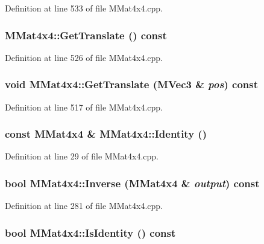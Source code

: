 Definition at line 533 of file MMat4x4.cpp.\hypertarget{class_m_mat4x4_f4ccc5d98e02464db6bb4660851305ad}{
\subsubsection[{GetTranslate}]{ MMat4x4::GetTranslate () const}}
\label{class_m_mat4x4_f4ccc5d98e02464db6bb4660851305ad}




Definition at line 526 of file MMat4x4.cpp.\hypertarget{class_m_mat4x4_cb765b649243077af476897147c75919}{
\subsubsection[{GetTranslate}]{\setlength{\rightskip}{0pt plus 5cm}void MMat4x4::GetTranslate ({\bf MVec3} \& {\em pos}) const}}
\label{class_m_mat4x4_cb765b649243077af476897147c75919}




Definition at line 517 of file MMat4x4.cpp.\hypertarget{class_m_mat4x4_ea61fe6cd5a7fdea9260a96812a95298}{
\subsubsection[{Identity}]{\setlength{\rightskip}{0pt plus 5cm}const {\bf MMat4x4} \& MMat4x4::Identity ()}}
\label{class_m_mat4x4_ea61fe6cd5a7fdea9260a96812a95298}




Definition at line 29 of file MMat4x4.cpp.\hypertarget{class_m_mat4x4_5045e1a3e2dda8f62a8c3cba29b721db}{
\subsubsection[{Inverse}]{\setlength{\rightskip}{0pt plus 5cm}bool MMat4x4::Inverse ({\bf MMat4x4} \& {\em output}) const}}
\label{class_m_mat4x4_5045e1a3e2dda8f62a8c3cba29b721db}




Definition at line 281 of file MMat4x4.cpp.\hypertarget{class_m_mat4x4_4b4855dfac02d865ba6bad9a83f40dd0}{
\subsubsection[{IsIdentity}]{\setlength{\rightskip}{0pt plus 5cm}bool MMat4x4::IsIdentity () const}}
\label{class_m_mat4x4_4b4855dfac02d865ba6bad9a83f40dd0}




